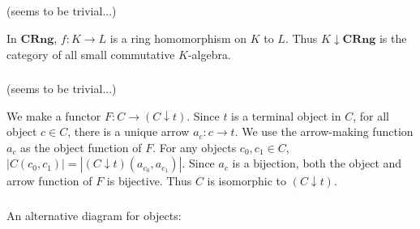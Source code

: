 \documentclass{article}
\begin{document}
\subsubsection{}

\subsubsection{}

\subsubsection{}

\subsection{}

\subsubsection{}

\showArt

(seems to be trivial...)

In $\mathbf{CRng}$, $f : K \rightarrow L$ is a ring homomorphism on $K$ to $L$. Thus $K \downarrow \mathbf{CRng}$ is the category of all small commutative $K$-algebra.

\subsubsection{}

\showArt

(seems to be trivial...)

We make a functor $F : C \rightarrow (C \downarrow t)$. Since $t$ is a terminal object in $C$, for all object $c \in C$, there is a unique arrow $a_c : c \rightarrow t$. We use the arrow-making function $a_c$ as the object function of $F$. For any objects $c_0, c_1 \in C$, $|C(c_0, c_1)| = |(C \downarrow t)(a_{c_0}, a_{c_1})|$. Since $a_c$ is a bijection, both the object and arrow function of $F$ is bijective. Thus $C$ is isomorphic to $(C \downarrow t)$. 

\subsubsection{}

\showArt

An alternative diagram for objects:

\begin{center}
\end{center}
\end{document}
